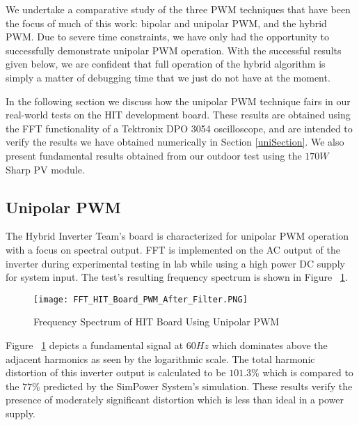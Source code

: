 We undertake a comparative study of the three PWM techniques that have been the focus of much of this work: bipolar and unipolar PWM, and the hybrid PWM. 
Due to severe time constraints, we have only had the opportunity to successfully demonstrate unipolar PWM operation. With the successful results given below, we are confident that full operation of the hybrid algorithm is simply a matter of debugging time that we just do not have at the moment.

In the following section we discuss how the unipolar PWM technique fairs in our real-world tests on the HIT development board. These results are obtained using the FFT functionality of a Tektronix DPO 3054 oscilloscope, and are intended to verify the results we have obtained numerically in Section \ref{uniSection}. We also present fundamental results obtained from our outdoor test using the $170W$ Sharp PV module.


\subsection{Unipolar PWM}
The Hybrid Inverter Team's board is characterized for unipolar PWM operation with a focus on spectral output. FFT is implemented on the AC output of the inverter during experimental testing in lab while using a high power DC supply for system input. The test's resulting frequency spectrum is shown in Figure ~\ref{FFT HIT Board PWM After Filter}.

\begin{figure}
\centering
\texttt{[image: FFT\_HIT\_Board\_PWM\_After\_Filter.PNG]}
\caption{Frequency Spectrum of HIT Board Using Unipolar PWM}
\label{FFT HIT Board PWM After Filter}
\end{figure}

Figure ~\ref{FFT HIT Board PWM After Filter} depicts a fundamental signal at $60 Hz$ which dominates above the adjacent harmonics as seen by the logarithmic scale. The total harmonic distortion of this inverter output is calculated to be $101.3\%$ which is compared to the $77\%$ predicted by the SimPower System's simulation. These results verify the presence of moderately significant distortion which is less than ideal in a power supply. 

